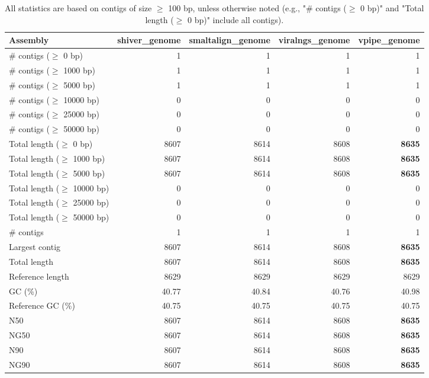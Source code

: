 \documentclass[12pt,a4paper]{article}
\begin{document}
\begin{table}[ht]
\begin{center}
\caption{All statistics are based on contigs of size $\geq$ 100 bp, unless otherwise noted (e.g., "\# contigs ($\geq$ 0 bp)" and "Total length ($\geq$ 0 bp)" include all contigs).}
\begin{tabular}{|l*{4}{|r}|}
\hline
Assembly & shiver\_genome & smaltalign\_genome & viralngs\_genome & vpipe\_genome \\ \hline
\# contigs ($\geq$ 0 bp) & 1 & 1 & 1 & 1 \\ \hline
\# contigs ($\geq$ 1000 bp) & 1 & 1 & 1 & 1 \\ \hline
\# contigs ($\geq$ 5000 bp) & 1 & 1 & 1 & 1 \\ \hline
\# contigs ($\geq$ 10000 bp) & 0 & 0 & 0 & 0 \\ \hline
\# contigs ($\geq$ 25000 bp) & 0 & 0 & 0 & 0 \\ \hline
\# contigs ($\geq$ 50000 bp) & 0 & 0 & 0 & 0 \\ \hline
Total length ($\geq$ 0 bp) & 8607 & 8614 & 8608 & {\bf 8635} \\ \hline
Total length ($\geq$ 1000 bp) & 8607 & 8614 & 8608 & {\bf 8635} \\ \hline
Total length ($\geq$ 5000 bp) & 8607 & 8614 & 8608 & {\bf 8635} \\ \hline
Total length ($\geq$ 10000 bp) & 0 & 0 & 0 & 0 \\ \hline
Total length ($\geq$ 25000 bp) & 0 & 0 & 0 & 0 \\ \hline
Total length ($\geq$ 50000 bp) & 0 & 0 & 0 & 0 \\ \hline
\# contigs & 1 & 1 & 1 & 1 \\ \hline
Largest contig & 8607 & 8614 & 8608 & {\bf 8635} \\ \hline
Total length & 8607 & 8614 & 8608 & {\bf 8635} \\ \hline
Reference length & 8629 & 8629 & 8629 & 8629 \\ \hline
GC (\%) & 40.77 & 40.84 & 40.76 & 40.98 \\ \hline
Reference GC (\%) & 40.75 & 40.75 & 40.75 & 40.75 \\ \hline
N50 & 8607 & 8614 & 8608 & {\bf 8635} \\ \hline
NG50 & 8607 & 8614 & 8608 & {\bf 8635} \\ \hline
N90 & 8607 & 8614 & 8608 & {\bf 8635} \\ \hline
NG90 & 8607 & 8614 & 8608 & {\bf 8635} \\ \hline

\end{tabular}
\end{center}
\end{table}
\end{document}
